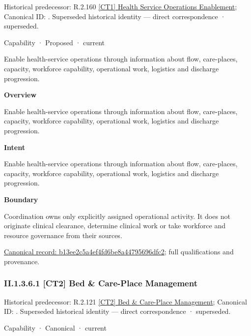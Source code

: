 {\small Historical predecessor: R.2.160 \hyperref[element:a98424298dac46d8b2ddd109d928270a]{[CT1] Health Service Operations Enablement}; Canonical ID: \texttt{}. Superseded historical identity — direct correspondence · superseded.}\par
\label{element:b13ee2c5a4ef4fd6be8a44795696dfc2}
{\small Capability · Proposed · current}\par

Enable health-service operations through information about flow, care-places, capacity, workforce capability, operational work, logistics and discharge progression.



\textbf{Overview}



Enable health-service operations through information about flow, care-places, capacity, workforce capability, operational work, logistics and discharge progression.



\textbf{Intent}



Enable health-service operations through information about flow, care-places, capacity, workforce capability, operational work, logistics and discharge progression.



\textbf{Boundary}



Coordination owns only explicitly assigned operational activity. It does not originate clinical clearance, determine clinical work or take workforce and resource governance from their sources.


{\footnotesize \href{../../../../../../../continuum/strategy/capability/b13ee2c5a4ef4fd6be8a44795696dfc2.md}{Canonical record: b13ee2c5a4ef4fd6be8a44795696dfc2}; full qualifications and provenance.}\par
\subsubsection*{II.1.3.6.1 [CT2] Bed \& Care-Place Management}
\label{navigation:II.1.3.6.1}

{\small Historical predecessor: R.2.121 \hyperref[element:c94d29b7d1c045dabc7814ceea795484]{[CT2] Bed \& Care-Place Management}; Canonical ID: \texttt{}. Superseded historical identity — direct correspondence · superseded.}\par
\label{element:f117ccec0bfa4f738e6ddb646b3534a2}
{\small Capability · Canonical · current}\par

